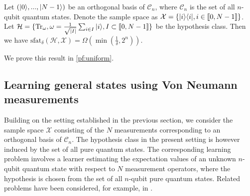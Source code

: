 \begin{theorem}\label{theo:uniform}
    Let $(| 0 \rangle,...,| N-1 \rangle)$ be an orthogonal basis of $\mathcal C_n$, where $\mathcal{C}_n$ is the set of all $n$-qubit quantum states. Denote the sample space as $\mathcal{X}=\{| i \rangle \langle i |,i\in\llbracket 0, N-1 \rrbracket\}$. Let $\mathcal{H}=\{\operatorname{Tr}_\omega,\omega=\frac1{\sqrt{\vert I\vert}}\sum_{i\in I}| i \rangle, I\subset\llbracket0,N-1\rrbracket\}$ be the hypothesis class. Then we have $\text{sfat}_\delta(\mathcal H, \mathcal{X})=\Omega(\min(\frac1\delta,2^n))$.

\end{theorem}

We prove this result in \cref{pf:uniform}.

\subsection{Learning general states using Von Neumann measurements}


Building on the setting established in the previous section, we consider the sample space $\mathcal{X}$ consisting of the $N$ measurements corresponding to an orthogonal basis of $\mathcal C_n$. The hypothesis class in the present setting is however induced by the set of all pure quantum states. The corresponding learning problem involves a learner estimating the expectation values of an unknown $n$-qubit quantum state with respect to $N$ measurement operators, where the hypothesis is chosen from the set of all $n$-qubit pure quantum states.
Related problems have been considered, for example, in \citet{zhao2023provablelearningquantumstates}.

